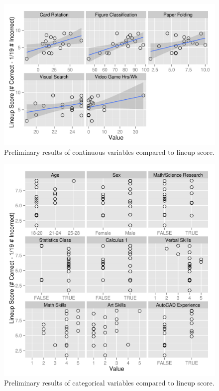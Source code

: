 \documentclass[11pt]{isuthesis}\usepackage[]{graphicx}\usepackage[]{color}
\begin{document}
\begin{figure}[htbp]\centering
\includegraphics[width=\textwidth]{fig-VisReasoningAnalysisCts}
\caption[Visual Aptitude Study Results]{Preliminary results of continuous variables compared to lineup score.}\label{fig:visualaptitudects}
\end{figure}

\begin{figure}[htbp]\centering
\includegraphics[width=\textwidth]{fig-VisReasoningAnalysisCat}
\caption[Visual Aptitude Study Results]{Preliminary results of categorical variables compared to lineup score.}\label{fig:visualaptitudecat}
\end{figure}
\end{document}
